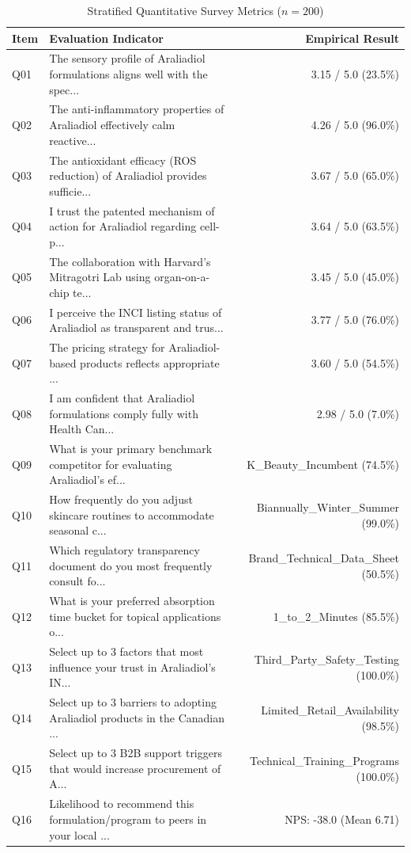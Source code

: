 \documentclass[10pt,twocolumn,a4paper]{article}
\begin{document}
\begin{table}[t]
\centering
\caption{Stratified Quantitative Survey Metrics ($n = 200$)}
\label{tab:metrics}
\small
\begin{tabularx}{\textwidth}{l X r}
\toprule
\textbf{Item} & \textbf{Evaluation Indicator} & \textbf{Empirical Result} \\
\midrule
Q01 & The sensory profile of Araliadiol formulations aligns well with the spec... & 3.15 / 5.0 (23.5\%) \\
Q02 & The anti-inflammatory properties of Araliadiol effectively calm reactive... & 4.26 / 5.0 (96.0\%) \\
Q03 & The antioxidant efficacy (ROS reduction) of Araliadiol provides sufficie... & 3.67 / 5.0 (65.0\%) \\
Q04 & I trust the patented mechanism of action for Araliadiol regarding cell-p... & 3.64 / 5.0 (63.5\%) \\
Q05 & The collaboration with Harvard's Mitragotri Lab using organ-on-a-chip te... & 3.45 / 5.0 (45.0\%) \\
Q06 & I perceive the INCI listing status of Araliadiol as transparent and trus... & 3.77 / 5.0 (76.0\%) \\
Q07 & The pricing strategy for Araliadiol-based products reflects appropriate ... & 3.60 / 5.0 (54.5\%) \\
Q08 & I am confident that Araliadiol formulations comply fully with Health Can... & 2.98 / 5.0 (7.0\%) \\
Q09 & What is your primary benchmark competitor for evaluating Araliadiol's ef... & K\_Beauty\_Incumbent (74.5\%) \\
Q10 & How frequently do you adjust skincare routines to accommodate seasonal c... & Biannually\_Winter\_Summer (99.0\%) \\
Q11 & Which regulatory transparency document do you most frequently consult fo... & Brand\_Technical\_Data\_Sheet (50.5\%) \\
Q12 & What is your preferred absorption time bucket for topical applications o... & 1\_to\_2\_Minutes (85.5\%) \\
Q13 & Select up to 3 factors that most influence your trust in Araliadiol's IN... & Third\_Party\_Safety\_Testing (100.0\%) \\
Q14 & Select up to 3 barriers to adopting Araliadiol products in the Canadian ... & Limited\_Retail\_Availability (98.5\%) \\
Q15 & Select up to 3 B2B support triggers that would increase procurement of A... & Technical\_Training\_Programs (100.0\%) \\
Q16 & Likelihood to recommend this formulation/program to peers in your local ... & NPS: -38.0 (Mean 6.71) \\
\bottomrule
\end{tabularx}
\end{table}
\end{document}
